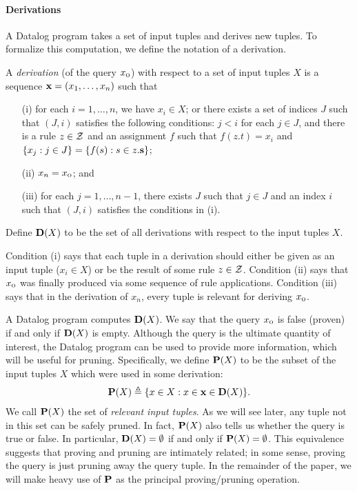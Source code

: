 \paragraph{Derivations}

A Datalog program takes a set of input tuples and derives new
tuples.  To formalize this computation, we define the notation of a derivation.

A {\em derivation} (of the query $x_\text{\sc o}$) with respect to a set of input tuples
$X$ is a sequence $\mathbf{x} = (x_1, \dots, x_n)$ such that
\begin{enumerate}
\item [(i)] for each $i = 1, \dots, n$, we have $x_i \in X$; or
there exists a set of indices $J$ such that $(J,i)$ satisfies the following conditions:
$j < i$ for each $j \in J$, and
there is a rule $z \in \mathcal{Z}$ and an assignment $f$
such that $f(z.t) = x_i$ and
$\{ x_j : j \in J \} = \{ f(s) : s \in z.\mathbf{s} \}$;
\item [(ii)] $x_n = x_\text{\sc o}$; and
\item [(iii)] 
for each $j = 1, \dots, n\!-\!1$,
there exists $J$ such that $j \in J$ and an index $i$
such that $(J,i)$ satisfies the conditions in (i).
\end{enumerate}
Define $\mathbf{D}(X)$ to be the set of all derivations with respect to the input tuples $X$.

Condition (i) says that each tuple in a derivation
should either be given as an input tuple ($x_i \in X$)
or be the result of some rule $z \in \mathcal{Z}$.
Condition (ii) says that $x_\text{\sc o}$ was finally produced via some sequence of rule applications.
Condition (iii) says that in the derivation of $x_n$, every tuple is relevant for deriving $x_\text{\sc o}$.

A Datalog program computes $\mathbf{D}(X)$.
We say that the query $x_\text{\sc o}$ is false (proven) if and only if $\mathbf{D}(X)$ is empty.
Although the query is the ultimate quantity of interest,
the Datalog program can be used to provide more information, which will be useful for pruning.
Specifically, we define $\mathbf{P}(X)$ to be the subset of the input tuples $X$
which were used in some derivation:
\begin{align}
\label{eqn:Pdef}
\mathbf{P}(X) \triangleq \{ x \in X : x \in \mathbf{x} \in \mathbf{D}(X) \}.
\end{align}
We call $\mathbf{P}(X)$ the set of {\em relevant input tuples}.  As we will see later,
any tuple not in this set can be safely pruned.
In fact, $\mathbf{P}(X)$ also tells us whether the query is true or false.
In particular, $\mathbf{D}(X) = \emptyset$ if and only if $\mathbf{P}(X) = \emptyset$.
This equivalence suggests that proving and pruning are intimately related;
in some sense, proving the query is just pruning away the query tuple.
In the remainder of the paper, we will make heavy use of $\mathbf{P}$ as the principal
proving/pruning operation.

